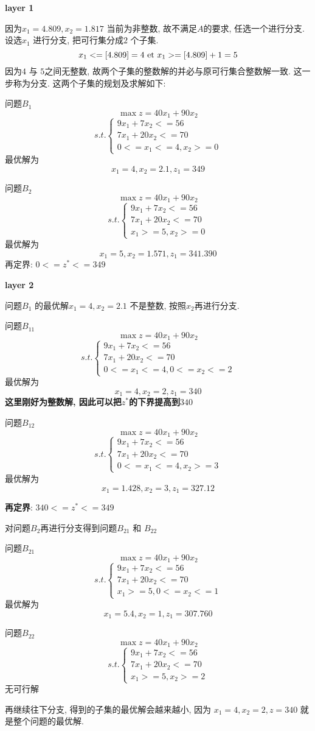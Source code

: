\textbf{layer 1}\par
因为$ x_1 = 4.809, x_2 = 1.817$ 当前为非整数, 故不满足$A$的要求, 任选一个进行分支. 设选$x_1$ 进行分支, 把可行集分成$2$ 个子集.
$$x_1 <= [4.809] = 4 \textrm{\ et } x_1 >= [4.809] + 1 = 5$$
因为$4$ 与 $5$之间无整数, 故两个子集的整数解的并必与原可行集合整数解一致. 这一步称为分支.
这两个子集的规划及求解如下:

问题$B_1$
$$ \max z = 40 x_1 + 90 x_2 $$
$$
s.t.
\begin{cases}
9 x_1 + 7 x_2 <= 56 \\
7 x_1 + 20 x_2 <= 70 \\
0 <= x_1 <= 4, x_2 >= 0
\end{cases}
$$
最优解为$$x_1 = 4, x_2 = 2.1, z_1 = 349$$

问题$B_2$
$$ \max z = 40 x_1 + 90 x_2 $$
$$
s.t.
\begin{cases}
9 x_1 + 7 x_2 <= 56 \\
7 x_1 + 20 x_2 <= 70 \\
x_1 >= 5, x_2 >= 0
\end{cases}
$$
最优解为$$x_1 = 5, x_2 = 1.571, z_1 = 341.390$$
再定界: $0 <= z^* <= 349$

\textbf{layer 2}\par
问题$B_1$ 的最优解$x_1 = 4, x_2 = 2.1$ 不是整数, 按照$x_2$再进行分支.

问题$B_{11}$
$$ \max z = 40 x_1 + 90 x_2 $$
$$
s.t.
\begin{cases}
9 x_1 + 7 x_2 <= 56 \\
7 x_1 + 20 x_2 <= 70 \\
0 <= x_1 <= 4, 0 <= x_2 <= 2
\end{cases}
$$
最优解为$$x_1 = 4, x_2 = 2, z_1 = 340$$
\textbf{这里刚好为整数解, 因此可以把$z^*$的下界提高到$340$}

问题$B_{12}$
$$ \max z = 40 x_1 + 90 x_2 $$
$$
s.t.
\begin{cases}
9 x_1 + 7 x_2 <= 56 \\
7 x_1 + 20 x_2 <= 70 \\
0 <= x_1 <= 4, x_2 >= 3
\end{cases}
$$
最优解为$$x_1 = 1.428, x_2 = 3, z_1 = 327.12$$

\textbf{再定界}: $340 <= z^* <= 349$

对问题$B_2$再进行分支得到问题$B_{21}$ 和 $B_{22}$

问题$B_{21}$
$$ \max z = 40 x_1 + 90 x_2 $$
$$
s.t.
\begin{cases}
9 x_1 + 7 x_2 <= 56 \\
7 x_1 + 20 x_2 <= 70 \\
x_1 >= 5, 0 <= x_2 <= 1 
\end{cases}
$$
最优解为$$x_1 = 5.4, x_2 = 1, z_1 = 307.760$$

问题$B_{22}$
$$ \max z = 40 x_1 + 90 x_2 $$
$$
s.t.
\begin{cases}
9 x_1 + 7 x_2 <= 56 \\
7 x_1 + 20 x_2 <= 70 \\
x_1 >= 5, x_2 >= 2 
\end{cases}
$$
无可行解

再继续往下分支, 得到的子集的最优解会越来越小, 因为 $x_1 = 4, x_2 = 2, z = 340$ 就是整个问题的最优解.

